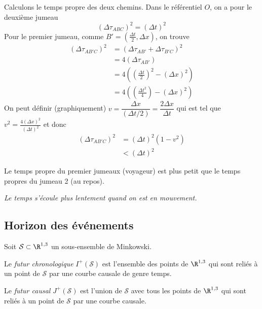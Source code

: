 {Calculons le temps propre des deux chemins. Dans le référentiel $O$, on a pour le deuxième jumeau
\begin{equation}
    (\Delta \tau_{ABC})^2 = (\Delta t)^2
\end{equation} 
Pour le premier jumeau, comme $B'=(\frac{\Delta t}{2},\Delta x)$, on trouve
\begin{align}
        (\Delta \tau_{AB'C})^2 &= (\Delta \tau_{AB'} + \Delta \tau_{B'C})^2\\
        &= 4(\Delta \tau_{AB'})\\
        &= 4 \left(\left(\frac{\Delta t}{2}\right)^2 - (\Delta x)^2\right)\\
        &= 4 \left(\left(\frac{\Delta t^2}{4}\right) - (\Delta x)^2\right)
    \end{align}
    On peut définir (graphiquement) $v = \dfrac{\Delta x}{(\Delta t/2)} = \dfrac{2 \Delta x}{\Delta t}$ qui est tel que $v^2 = \frac{4(\Delta x)^2}{(\Delta t)^2}$ et donc
    \begin{align*}
        (\Delta \tau_{AB'C})^2 &= (\Delta t)^2(1 - v^2)\\
        &< (\Delta t)^2
    \end{align*}

Le temps propre du premier jumeaux (voyageur) est plus petit que le temps propres du jumeau 2 (au repos). 
\begin{center}
    \textit{Le temps s'écoule plus lentement quand on est en mouvement.}
\end{center}

\subsection{Horizon des événements} 

Soit $\mathcal{S} \subset \R^{1,3}$  un sous-ensemble de Minkowski. 
\begin{theoremframe}
    \begin{defi}
        Le \emph{futur chronologique} $I^{+}(\mathcal{S})$ est l'ensemble des points de $\R^{1,3}$ qui sont reliés à un point de $\mathcal{S}$ par une courbe causale de genre temps. 
    \end{defi}
\end{theoremframe}
\begin{theoremframe}
    \begin{defi}
        Le \emph{futur causal} $J^{+}(\mathcal{S})$ est l'union de $\mathcal{S}$ avec tous les points de $\R^{1,3}$ qui sont reliés à un point de $\mathcal{S}$ par une courbe causale. 
    \end{defi}
\end{theoremframe}

}
